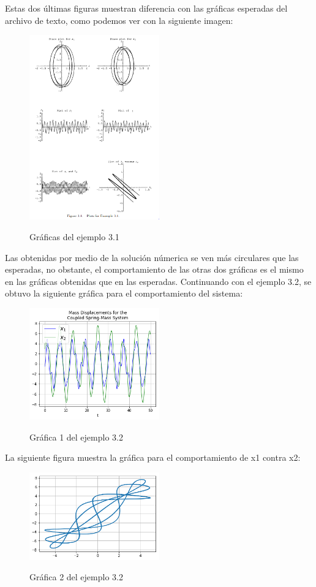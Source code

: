 \documentclass{article}
\begin{document}
Estas dos últimas figuras muestran diferencia con las gráficas esperadas del archivo de texto, como podemos ver con la siguiente imagen:
\begin{figure}[H]
    \caption{Gráficas del ejemplo 3.1}
    \includegraphics[width=0.5\textwidth]{Ejemplo5.PNG}
    \centering
    \label{Cod}
\end{figure}
Las obtenidas por medio de la solución númerica se ven más circulares que las esperadas, no obstante, el comportamiento de las otras dos gráficas es el mismo en las gráficas obtenidas que en las esperadas.
Continuando con el ejemplo 3.2, se obtuvo la siguiente gráfica para el comportamiento del sistema:
\begin{figure}[H]
    \caption{Gráfica 1 del ejemplo 3.2}
    \includegraphics[width=0.5\textwidth]{Grafica18.png}
    \centering
    \label{Cod}
\end{figure}
La siguiente figura muestra la gráfica para el comportamiento de x1 contra x2:
\begin{figure}[H]
    \caption{Gráfica 2 del ejemplo 3.2}
    \includegraphics[width=0.5\textwidth]{Grafica19.png}
    \centering
    \label{Cod}
\end{figure}
\end{document}
